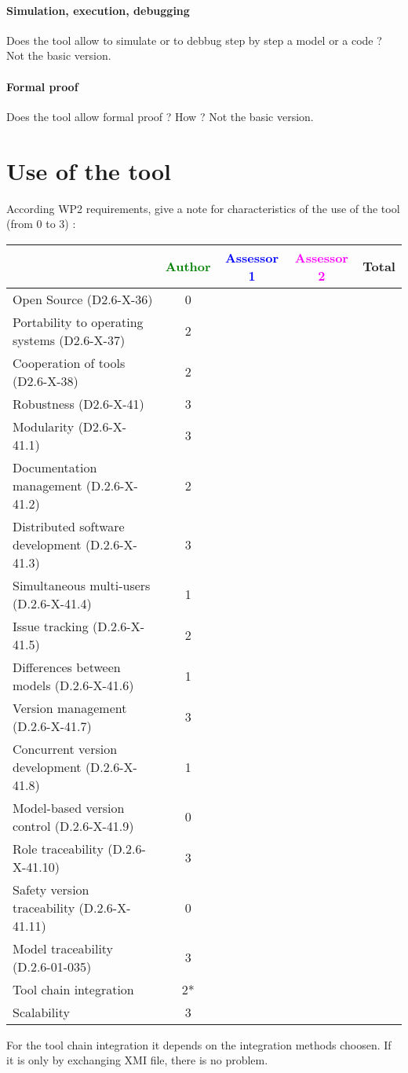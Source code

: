 \paragraph{Simulation, execution, debugging}
Does the tool allow to simulate or to debbug step by step a model or a code ?
Not the basic version.
\paragraph{Formal proof}
Does the tool allow formal proof ?  How ?
Not the basic version.


\section{Use of the tool}


According WP2 requirements, give a note for characteristics of the use of the tool (from 0 to 3) :

\begin{tabular}{|l | c | c | c | c|}
\hline
& \textcolor{green}{Author} & \textcolor{blue}{Assessor 1} & \textcolor{magenta}{Assessor 2} & Total \\
\hline 
Open Source (D2.6-X-36) &0 & & &  \\
\hline 
Portability to operating systems (D2.6-X-37) &2 & & &  \\
\hline
Cooperation of tools (D2.6-X-38) &2 & & &  \\
\hline
Robustness (D2.6-X-41) &3 & & & \\
\hline
Modularity (D2.6-X-41.1) &3 & & & \\
\hline
Documentation management (D.2.6-X-41.2) & 2& & & \\
\hline
Distributed software development (D.2.6-X-41.3)  &3 & & & \\
\hline
Simultaneous multi-users (D.2.6-X-41.4)   &1 & & & \\
\hline
Issue tracking (D.2.6-X-41.5) &2 & & & \\
\hline
Differences between models (D.2.6-X-41.6) &1 & & & \\
\hline
Version management (D.2.6-X-41.7) &3 & & & \\
\hline
Concurrent version development (D.2.6-X-41.8) &1 & & & \\
\hline
Model-based version control (D.2.6-X-41.9) &0 & & & \\
\hline
Role traceability (D.2.6-X-41.10) & 3& & & \\
\hline
Safety version traceability (D.2.6-X-41.11) &0 & & & \\
\hline
Model traceability (D.2.6-01-035) &3 & & & \\
\hline
Tool chain integration &2* & & & \\
\hline
Scalability &3 & & & \\
\hline
\end{tabular}
\begin{author_comment}
For the tool chain integration it depends on the integration methods
choosen. If it is only by exchanging XMI file, there is no problem.
\end{author_comment}
